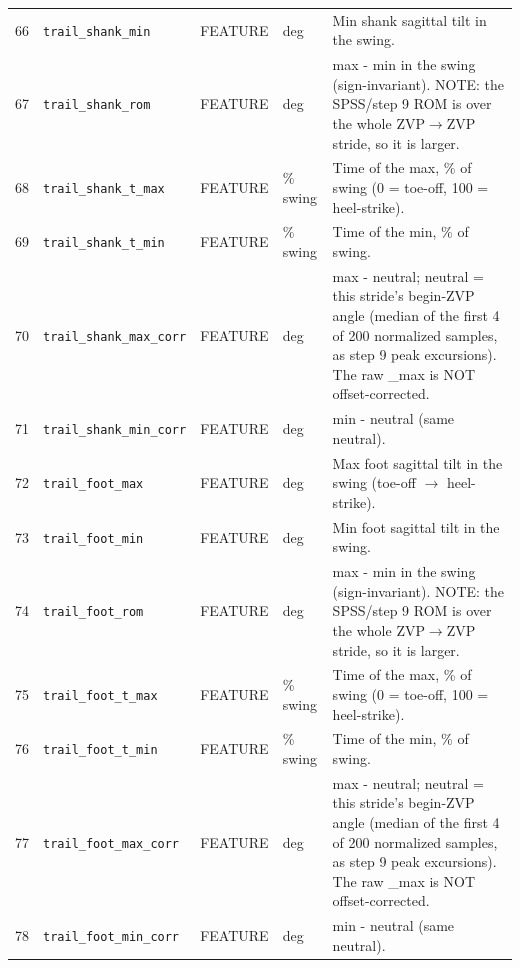 \begin{longtable}{@{}r p{3.6cm} p{1.55cm} p{1.15cm} p{8.6cm}@{}}
66 & \texttt{trail\_\allowbreak{}shank\_\allowbreak{}min} & FEATURE & deg & Min shank sagittal tilt in the swing. \\
67 & \texttt{trail\_\allowbreak{}shank\_\allowbreak{}rom} & FEATURE & deg & max - min in the swing (sign-invariant). NOTE: the SPSS/step 9 ROM is over the whole ZVP$\rightarrow$ZVP stride, so it is larger. \\
68 & \texttt{trail\_\allowbreak{}shank\_\allowbreak{}t\_\allowbreak{}max} & FEATURE & \% swing & Time of the max, \% of swing (0 = toe-off, 100 = heel-strike). \\
69 & \texttt{trail\_\allowbreak{}shank\_\allowbreak{}t\_\allowbreak{}min} & FEATURE & \% swing & Time of the min, \% of swing. \\
70 & \texttt{trail\_\allowbreak{}shank\_\allowbreak{}max\_\allowbreak{}corr} & FEATURE & deg & max - neutral; neutral = this stride's begin-ZVP angle (median of the first 4 of 200 normalized samples, as step 9 peak excursions). The raw \_max is NOT offset-corrected. \\
71 & \texttt{trail\_\allowbreak{}shank\_\allowbreak{}min\_\allowbreak{}corr} & FEATURE & deg & min - neutral (same neutral). \\
72 & \texttt{trail\_\allowbreak{}foot\_\allowbreak{}max} & FEATURE & deg & Max foot sagittal tilt in the swing (toe-off $\rightarrow$ heel-strike). \\
73 & \texttt{trail\_\allowbreak{}foot\_\allowbreak{}min} & FEATURE & deg & Min foot sagittal tilt in the swing. \\
74 & \texttt{trail\_\allowbreak{}foot\_\allowbreak{}rom} & FEATURE & deg & max - min in the swing (sign-invariant). NOTE: the SPSS/step 9 ROM is over the whole ZVP$\rightarrow$ZVP stride, so it is larger. \\
75 & \texttt{trail\_\allowbreak{}foot\_\allowbreak{}t\_\allowbreak{}max} & FEATURE & \% swing & Time of the max, \% of swing (0 = toe-off, 100 = heel-strike). \\
76 & \texttt{trail\_\allowbreak{}foot\_\allowbreak{}t\_\allowbreak{}min} & FEATURE & \% swing & Time of the min, \% of swing. \\
77 & \texttt{trail\_\allowbreak{}foot\_\allowbreak{}max\_\allowbreak{}corr} & FEATURE & deg & max - neutral; neutral = this stride's begin-ZVP angle (median of the first 4 of 200 normalized samples, as step 9 peak excursions). The raw \_max is NOT offset-corrected. \\
78 & \texttt{trail\_\allowbreak{}foot\_\allowbreak{}min\_\allowbreak{}corr} & FEATURE & deg & min - neutral (same neutral). \\

\end{longtable}

